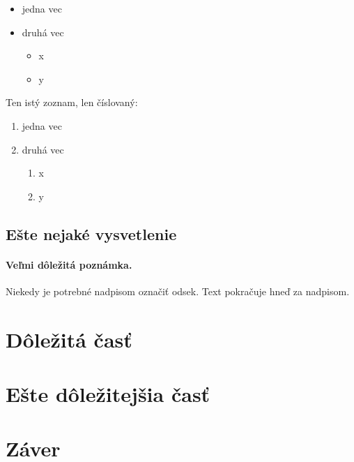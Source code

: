 \documentclass[10pt,twoside,slovak,a4paper]{article}
\begin{document}
\begin{itemize}
\item jedna vec
\item druhá vec
	\begin{itemize}
	\item x
	\item y
	\end{itemize}
\end{itemize}

Ten istý zoznam, len číslovaný:

\begin{enumerate}
\item jedna vec
\item druhá vec
	\begin{enumerate}
	\item x
	\item y
	\end{enumerate}
\end{enumerate}


\subsection{Ešte nejaké vysvetlenie} \label{ina:este}

\paragraph{Veľmi dôležitá poznámka.}
Niekedy je potrebné nadpisom označiť odsek. Text pokračuje hneď za nadpisom.



\section{Dôležitá časť} \label{dolezita}




\section{Ešte dôležitejšia časť} \label{dolezitejsia}




\section{Záver} \label{zaver} %






\end{document}
